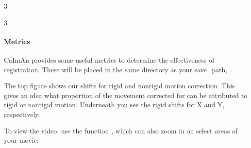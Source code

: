 \documentclass[letterpaper,10pt,english]{sphinxmanual}
\begin{document}
\begin{sphinxVerbatim}[commandchars=\\\{\}]
3

3
\end{sphinxVerbatim}

\noindent{}


\paragraph{Metrics}
\label{\detokenize{user_guide/pre_processing:metrics}}
\sphinxAtStartPar
CaImAn provides some useful metrics to determine the effectiveness of registration.
These will be placed in the same directory as your save\_path, .

\noindent{}

\sphinxAtStartPar
The top figure shows our shifts for rigid and non\sphinxhyphen{}rigid motion correction. This gives an idea what proportion of the movement corrected for can be attributed to rigid or non\sphinxhyphen{}rigid motion.
Underneath you see the rigid shifts for X and Y, respectively.

\sphinxAtStartPar
To view the video, use the function {\hyperref[\detokenize{api/utils:planeToMovie}]{}}, which can also zoom in on select areas of your movie:
\end{document}
